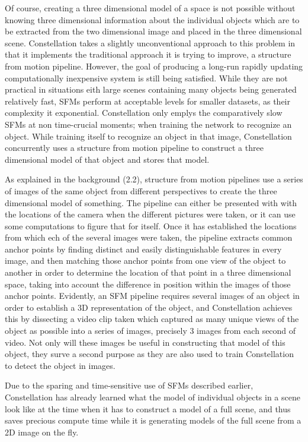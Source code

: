 Of course, creating a three dimensional model of a space is not possible without knowing three dimensional information about the individual objects which are to be extracted from the two dimensional image and placed in the three dimensional scene. Constellation takes a slightly unconventional approach to this problem in that it implements the traditional approach it is trying to improve, a structure from motion pipeline. However, the goal of producing a long-run rapidly updating computationally inexpensive system is still being satisfied. While they are not practical in situations eith large scenes containing many objects being generated relatively fast, SFMs perform at acceptable levels for smaller datasets, as their complexity it exponential. Constellation only emplys the comparatively slow SFMs at non time-crucial moments; when training the network to recognize an object. While training itself to recognize an object in that image, Constellation concurrently uses a structure from motion pipeline to construct a three dimensional model of that object and stores that model.

As explained in the background (2.2), structure from motion pipelines use a series of images of the same object from different perspectives to create the three dimensional model of something. The pipeline can either be presented with with the locations of the camera when the different pictures were taken, or it can use some computations to figure that for itself. Once it has established the locations from which ech of the several images were taken, the pipeline extracts common anchor points by finding distinct and easily distinguishable features in every image, and then matching those anchor points from one view of the object to another in order to determine the location of that point in a three dimensional space, taking into account the difference in position within the images of those anchor points. Evidently, an SFM pipeline requires several images of an object in order to establish a 3D representation of the object, and Constellation achieves this by dissecting a video clip taken which captured as many unique views of the object as possible into a series of images, precisely 3 images from each second of video. Not only will these images be useful in constructing that model of this object, they surve a second purpose as they are also used to train Constellation to detect the object in images.

 Due to the sparing and time-sensitive use of SFMs described earlier, Constellation has already learned what the model of individual objects in a scene look like at the time when it has to construct a model of a full scene, and thus saves precious compute time while it is generating models of the full scene from a 2D image on the fly.
